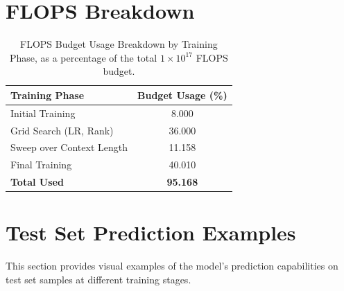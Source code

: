 \documentclass{article}
\begin{document}



\appendix



\section{FLOPS Breakdown}
\label{sec:flops-breakdown} 

\begin{table}[!htbp] %
\renewcommand{\arraystretch}{1.4}
\centering
{} %
\setlength{\tabcolsep}{8pt}
\begin{tabular}{l S[table-format=2.3]}
    \toprule
    \textbf{Training Phase}           & {\textbf{Budget Usage (\%)}} \\ %
    \midrule
    Initial Training                & 8.000 \\ %
    Grid Search (LR, Rank)        & 36.000 \\
    Sweep over Context Length     & 11.158 \\
    Final Training                  & 40.010 \\
    \midrule %
    \textbf{Total Used}             & \bfseries 95.168 \\ %
    \bottomrule
\end{tabular}
\caption{FLOPS Budget Usage Breakdown by Training Phase, as a percentage of the total $1 \times 10^{17}$ FLOPS budget.} 
\label{tab:flops_budget_usage}
\end{table}

\section{Test Set Prediction Examples} %
\label{sec:appendix_predictions} %

This section provides visual examples of the model's prediction capabilities on test set samples at different training stages.
\end{document}

